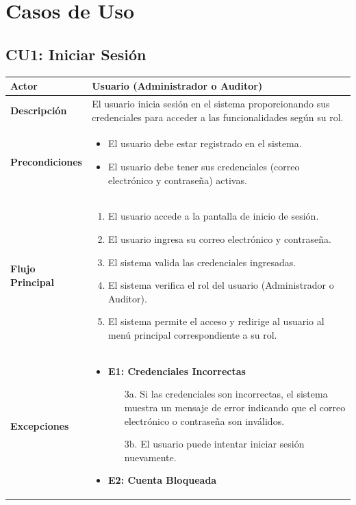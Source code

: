 \documentclass{article}
\begin{document}
\newpage
\section{Casos de Uso}
\subsection{CU1: Iniciar Sesión}
\begin{longtable}{|l|p{10cm}|}
\hline
\textbf{Actor} & Usuario (Administrador o Auditor) \\ \hline
\textbf{Descripción} & El usuario inicia sesión en el sistema proporcionando sus credenciales para acceder a las funcionalidades según su rol. \\ \hline
\textbf{Precondiciones} & 
\begin{itemize}
    \item El usuario debe estar registrado en el sistema.
    \item El usuario debe tener sus credenciales (correo electrónico y contraseña) activas.
\end{itemize} \\ \hline
\textbf{Flujo Principal} & 
\begin{enumerate}
    \item El usuario accede a la pantalla de inicio de sesión.
    \item El usuario ingresa su correo electrónico y contraseña.
    \item El sistema valida las credenciales ingresadas.
    \item El sistema verifica el rol del usuario (Administrador o Auditor).
    \item El sistema permite el acceso y redirige al usuario al menú principal correspondiente a su rol.
\end{enumerate} \\ \hline
\textbf{Excepciones} & 
\begin{itemize}
    \item \textbf{E1: Credenciales Incorrectas}
    \begin{enumerate}
        \item[3a.] Si las credenciales son incorrectas, el sistema muestra un mensaje de error indicando que el correo electrónico o contraseña son inválidos.
        \item[3b.] El usuario puede intentar iniciar sesión nuevamente.
    \end{enumerate}
    \item \textbf{E2: Cuenta Bloqueada}

\end{itemize}
\end{longtable}
\end{document}
